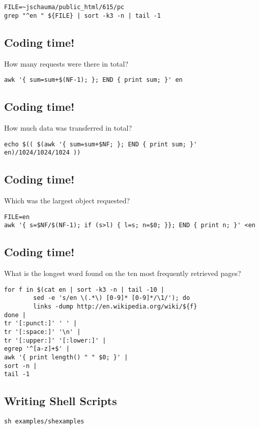 \documentclass[xga]{xdvislides}
\begin{document}
\begin{verbatim}
FILE=~jschauma/public_html/615/pc
grep "^en " ${FILE} | sort -k3 -n | tail -1
\end{verbatim}

\subsection{Coding time!}
How many requests were there in total?

\begin{verbatim}
awk '{ sum=sum+$(NF-1); }; END { print sum; }' en
\end{verbatim}

\subsection{Coding time!}
How much data was transferred in total?

\begin{verbatim}
echo $(( $(awk '{ sum=sum+$NF; }; END { print sum; }' en)/1024/1024/1024 ))
\end{verbatim}

\subsection{Coding time!}
Which was the largest object requested?

\begin{verbatim}
FILE=en
awk '{ s=$NF/$(NF-1); if (s>l) { l=s; n=$0; }}; END { print n; }' <en
\end{verbatim}

\subsection{Coding time!}
What is the longest word found on the ten most frequently retrieved pages?

\begin{verbatim}
for f in $(cat en | sort -k3 -n | tail -10 |
        sed -e 's/en \(.*\) [0-9]* [0-9]*/\1/'); do
        links -dump http://en.wikipedia.org/wiki/${f}
done |
tr '[:punct:]' ' ' |
tr '[:space:]' '\n' |
tr '[:upper:]' '[:lower:]' |
egrep '^[a-z]+$' |
awk '{ print length() " " $0; }' |
sort -n |
tail -1
\end{verbatim}

\subsection{Writing Shell Scripts}
{\tt sh examples/shexamples}
\end{document}
